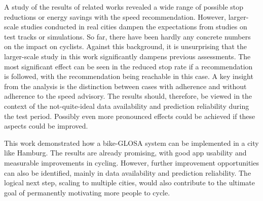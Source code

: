 A study of the results of related works revealed a wide range of possible stop reductions or energy savings with the speed recommendation. However, larger-scale studies conducted in real cities dampen the expectations from studies on test tracks or simulations. So far, there have been hardly any concrete numbers on the impact on cyclists. Against this background, it is unsurprising that the larger-scale study in this work significantly dampens previous assessments. The most significant effect can be seen in the reduced stop rate if a recommendation is followed, with the recommendation being reachable in this case. A key insight from the analysis is the distinction between cases with adherence and without adherence to the speed advisory. The results should, therefore, be viewed in the context of the not-quite-ideal data availability and prediction reliability during the test period. Possibly even more pronounced effects could be achieved if these aspects could be improved.

This work demonstrated how a bike-GLOSA system can be implemented in a city like Hamburg. The results are already promising, with good app usability and measurable improvements in cycling. However, further improvement opportunities can also be identified, mainly in data availability and prediction reliability. The logical next step, scaling to multiple cities, would also contribute to the ultimate goal of permanently motivating more people to cycle.